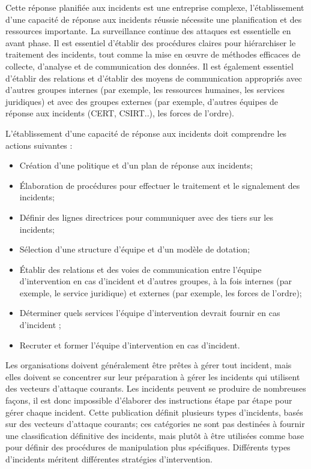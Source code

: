 Cette réponse planifiée aux incidents est une entreprise complexe, l'établissement d'une capacité de réponse aux incidents réussie nécessite une planification et des ressources importante. La surveillance continue des attaques est essentielle en avant phase. Il est essentiel d'établir des procédures claires pour hiérarchiser le traitement des incidents, tout comme la mise en œuvre de méthodes efficaces de collecte, d'analyse et de communication des données. Il est également essentiel d'établir des relations et d'établir des moyens de communication appropriés avec d'autres groupes internes (par exemple, les ressources humaines, les services juridiques) et avec des groupes externes (par exemple, d'autres équipes de réponse aux incidents (CERT, CSIRT..), les forces de l'ordre).

L'établissement d'une capacité de réponse aux incidents doit comprendre les actions suivantes :

\begin{itemize}
  \item Création d'une politique et d'un plan de réponse aux incidents;
  \item  Élaboration de procédures pour effectuer le traitement et le signalement des incidents;
  \item Définir des lignes directrices pour communiquer avec des tiers sur les incidents;
   \item Sélection d'une structure d'équipe et d'un modèle de dotation;
  \item  Établir des relations et des voies de communication entre l'équipe d'intervention en cas d'incident et d'autres groupes, à la fois internes (par exemple, le service juridique) et externes (par exemple, les forces de l'ordre);
  \item Déterminer quels services l'équipe d'intervention devrait fournir en cas d'incident ;
  \item Recruter et former l'équipe d'intervention en cas d'incident.
\end{itemize}


Les organisations doivent généralement être prêtes à gérer tout incident, mais elles doivent se concentrer sur leur préparation à gérer les incidents qui utilisent des vecteurs d'attaque courants.
Les incidents peuvent se produire de nombreuses façons, il est donc impossible d'élaborer des instructions étape par étape pour gérer chaque incident. Cette publication définit plusieurs types d'incidents, basés sur des vecteurs d'attaque courants; ces catégories ne sont pas destinées à fournir une classification définitive des incidents, mais plutôt à être utilisées comme base pour définir des procédures de manipulation plus spécifiques. Différents types d'incidents méritent différentes stratégies d'intervention. 

